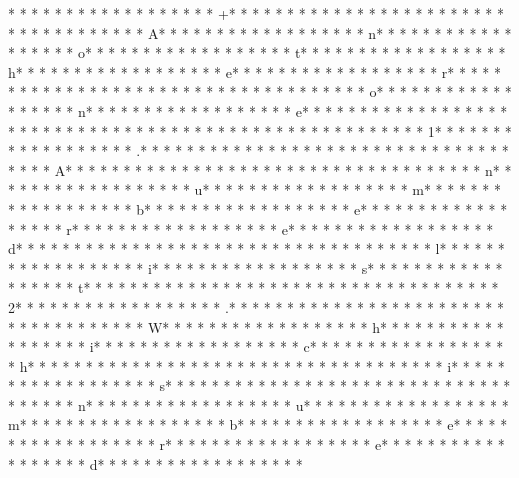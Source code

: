 * * *  * * *  * * *  *  * * *  *  * * *  * +* * *  * * *  * * *  *  * * *  *  * * *  *  * * *  * * *  * * *  *  * * *  *  * * *  * A* * *  * * *  * * *  *  * * *  *  * * *  * n* * *  * * *  * * *  *  * * *  *  * * *  * o* * *  * * *  * * *  *  * * *  *  * * *  * t* * *  * * *  * * *  *  * * *  *  * * *  * h* * *  * * *  * * *  *  * * *  *  * * *  * e* * *  * * *  * * *  *  * * *  *  * * *  * r* * *  * * *  * * *  *  * * *  *  * * *  *  * * *  * * *  * * *  *  * * *  *  * * *  * o* * *  * * *  * * *  *  * * *  *  * * *  * n* * *  * * *  * * *  *  * * *  *  * * *  * e* * *  * * *  * * *  *  * * *  *  * * *  * 
* * *  * * *  * * *  *  * * *  *  * * *  * 
* * *  * * *  * * *  *  * * *  *  * * *  * 1* * *  * * *  * * *  *  * * *  *  * * *  * .* * *  * * *  * * *  *  * * *  *  * * *  *  * * *  * * *  * * *  *  * * *  *  * * *  * A* * *  * * *  * * *  *  * * *  *  * * *  *  * * *  * * *  * * *  *  * * *  *  * * *  * n* * *  * * *  * * *  *  * * *  *  * * *  * u* * *  * * *  * * *  *  * * *  *  * * *  * m* * *  * * *  * * *  *  * * *  *  * * *  * b* * *  * * *  * * *  *  * * *  *  * * *  * e* * *  * * *  * * *  *  * * *  *  * * *  * r* * *  * * *  * * *  *  * * *  *  * * *  * e* * *  * * *  * * *  *  * * *  *  * * *  * d* * *  * * *  * * *  *  * * *  *  * * *  *  * * *  * * *  * * *  *  * * *  *  * * *  * l* * *  * * *  * * *  *  * * *  *  * * *  * i* * *  * * *  * * *  *  * * *  *  * * *  * s* * *  * * *  * * *  *  * * *  *  * * *  * t* * *  * * *  * * *  *  * * *  *  * * *  * 
* * *  * * *  * * *  *  * * *  *  * * *  * 2* * *  * * *  * * *  *  * * *  *  * * *  * .* * *  * * *  * * *  *  * * *  *  * * *  *  * * *  * * *  * * *  *  * * *  *  * * *  * W* * *  * * *  * * *  *  * * *  *  * * *  * h* * *  * * *  * * *  *  * * *  *  * * *  * i* * *  * * *  * * *  *  * * *  *  * * *  * c* * *  * * *  * * *  *  * * *  *  * * *  * h* * *  * * *  * * *  *  * * *  *  * * *  *  * * *  * * *  * * *  *  * * *  *  * * *  * i* * *  * * *  * * *  *  * * *  *  * * *  * s* * *  * * *  * * *  *  * * *  *  * * *  *  * * *  * * *  * * *  *  * * *  *  * * *  * n* * *  * * *  * * *  *  * * *  *  * * *  * u* * *  * * *  * * *  *  * * *  *  * * *  * m* * *  * * *  * * *  *  * * *  *  * * *  * b* * *  * * *  * * *  *  * * *  *  * * *  * e* * *  * * *  * * *  *  * * *  *  * * *  * r* * *  * * *  * * *  *  * * *  *  * * *  * e* * *  * * *  * * *  *  * * *  *  * * *  * d* * *  * * *  * * *  *  * * *  *  * * *  * 
